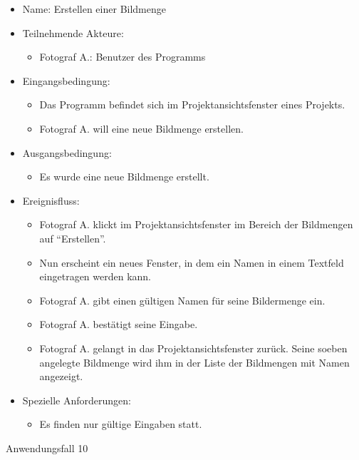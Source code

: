 	\begin{itemize}
		\item Name: Erstellen einer Bildmenge
		\item Teilnehmende Akteure:
		\begin{itemize}
			\item	Fotograf A.: Benutzer des Programms		
		\end{itemize}
		\item Eingangsbedingung:
		\begin{itemize}
			\item	Das Programm befindet sich im Projektansichtsfenster eines Projekts.
			\item Fotograf A. will eine neue Bildmenge erstellen.
		\end{itemize}
		\item Ausgangsbedingung:
		\begin{itemize}
			\item	Es wurde eine neue Bildmenge erstellt.	
		\end{itemize}
		\item Ereignisfluss:
		\begin{itemize}
			\item Fotograf A. klickt im Projektansichtsfenster im Bereich der Bildmengen auf "`Erstellen"'.		
			\item Nun erscheint ein neues Fenster, in dem ein Namen in einem Textfeld eingetragen werden kann.
			\item Fotograf A. gibt einen gültigen Namen für seine Bildermenge ein.
			\item Fotograf A. bestätigt seine Eingabe.
			\item Fotograf A. gelangt in das Projektansichtsfenster zurück. Seine soeben angelegte Bildmenge wird ihm in der Liste der Bildmengen mit Namen angezeigt.
		\end{itemize}
		\item Spezielle Anforderungen:
		\begin{itemize}
			\item	Es finden nur gültige Eingaben statt.		
		\end{itemize}			
	\end{itemize}
	
	\begin{description}
		\item[Anwendungsfall 10]
	\end{description}
	
